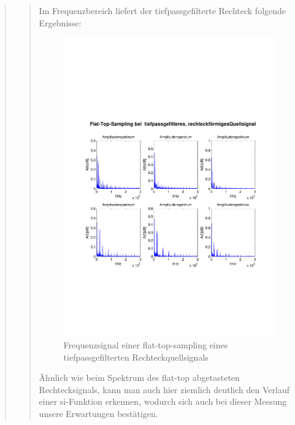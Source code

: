 \begin{quote}
\begin{quote}
      	    Im Frequenzbereich liefert der tiefpassgefilterte Rechteck folgende
      	    Ergebnisse:
      	    
      	    \begin{figure}[H]
            \centering
            \includegraphics[scale=0.6, trim = 1.5cm 6cm 1cm 8cm,
            clip]{./Bilder/flat-top-tp-recht_freq}
                \caption{Frequenzsignal einer flat-top-sampling eines tiefpassgefilterten Rechteckquellsignals}
      	    \end{figure}
      	    
      	    Ähnlich wie beim Spektrum des flat-top abgetasteten Rechtecksignals,
      	    kann man auch hier ziemlich deutlich den Verlauf einer si-Funktion
      	    erkennen, wodurch sich auch bei dieser Messung unsere Erwartungen
      	    bestätigen.
      	    
        \end{quote}  %
       	

\end{quote}
